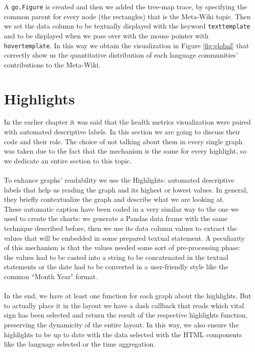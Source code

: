 A \verb#go.Figure# is created and then we added the tree-map trace, by specifying the common parent for every node (the rectangles) that is the Meta-Wiki topic. Then we set the data column to be textually displayed with the keyword \verb#texttemplate# and to be displayed when we pass over with the mouse pointer with \verb#hovertemplate#. In this way we obtain the visualization in Figure \ref{fig:global} that correctly show us the quantitative distribution of each language communities' contributions to the Meta-Wiki. 

\section{Highlights}
\label{sec:highlights}

In the earlier chapter it was said that the health metrics visualization were paired with automated descriptive labels. In this section we are going to discuss their code and their role. The choice of not talking about them in every single graph was taken due to the fact that the mechanism is the same for every highlight, so we dedicate an entire section to this topic.\\
\\
To enhance graphs' readability we use the Highlights: automated descriptive labels that help us reading the graph and its highest or lowest values. In general, they briefly contextualize the graph and describe what we are looking at.\\
These automatic caption have been coded in a very similar way to the one we used to create the charts: we generate a Pandas data frame with the same technique described before, then we use its data column values to extract the values that will be embedded in some prepared textual statement.
A peculiarity of this mechanism is that the values needed some sort of pre-processing phase: the values had to be casted into a string to be concatenated in the textual statements or the date had to be converted in a user-friendly style like the common ``Month Year" format.\\
\\
In the end, we have at least one function for each graph about the highlights. But to actually place it in the layout we have a dash callback that reads which vital sign has been selected and return the result of the respective highlights function, preserving the dynamicity of the entire layout. In this way, we also ensure the highlights to be up to date with the data selected with the HTML components like the language selected or the time aggregation.

